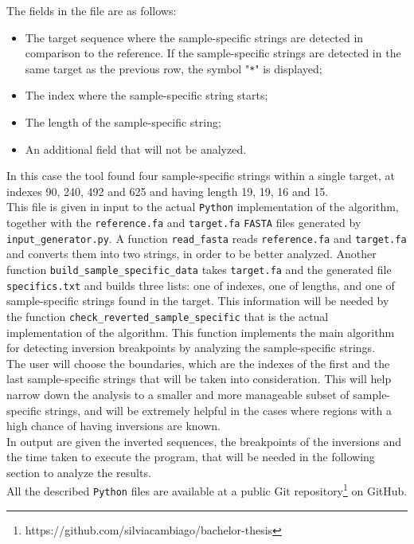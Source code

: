 The fields in the file are as follows:
\begin{itemize}
\item The target sequence where the sample-specific strings are detected in comparison to the reference. If the sample-specific strings are detected in the same target as the previous row, the symbol "\texttt{*}" is displayed;
\item The index where the sample-specific string starts;
\item The length of the sample-specific string;
\item An additional field that will not be analyzed. 
\end{itemize}

In this case the tool found four sample-specific strings within a single target, at indexes 90, 240, 492 and 625 and having length 19, 19, 16 and 15. \\
This file is given in input to the actual \texttt{Python} implementation of the algorithm, together with the \texttt{reference.fa} and \texttt{target.fa} \texttt{FASTA} files generated by \texttt{input\_generator.py}. A function \texttt{read\_fasta} reads \texttt{reference.fa} and \texttt{target.fa} and converts them into two strings, in order to be better analyzed. Another function \texttt{build\_sample\_specific\_data} takes  \texttt{target.fa} and the generated file  \texttt{specifics.txt} and builds three lists: one of indexes, one of lengths, and one of sample-specific strings found in the target. This information will be needed by the function  \texttt{check\_reverted\_sample\_specific} that is the actual implementation of the algorithm. This function implements the main algorithm for detecting inversion breakpoints by analyzing the sample-specific strings.\\
The user will choose the boundaries, which are the indexes of the first and the last sample-specific strings that will be taken into consideration. This will help narrow down the analysis to a smaller and more manageable subset of sample-specific strings, and will be extremely helpful in the cases where regions with a high chance of having inversions are known. \\
In output are given the inverted sequences, the breakpoints of the inversions and the time taken to execute the program, that will be needed in the following section to analyze the results. \\
All the described \texttt{Python} files are available at a public Git repository\footnote{https://github.com/silviacambiago/bachelor-thesis} on GitHub.


